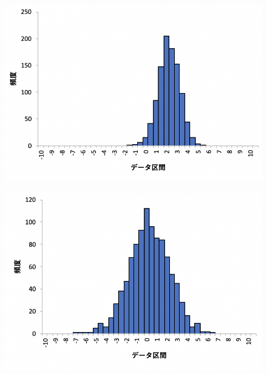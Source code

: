 \documentclass[12pt]{jarticle}
\begin{document}
\begin{figure}[h]
    \begin{center}
        \includegraphics[scale=0.7]{kadai4_3graph3.png}
    \end{center}
    \caption{}
\end{figure}
\begin{figure}[h]
    \begin{center}
        \includegraphics[scale=0.7]{kadai4_3graph4.png}
    \end{center}
    \caption{}
\end{figure}
\end{document}
